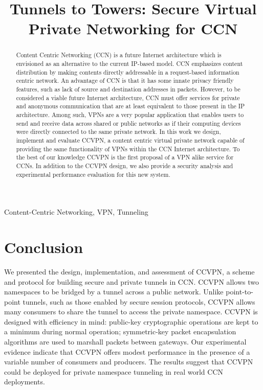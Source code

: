 \documentclass[conference,letterpaper,10pt]{IEEEtran}
\begin{document}
\title{Tunnels to Towers: Secure Virtual Private Networking for CCN}


\maketitle


\begin{abstract}
Content Centric Networking (CCN) is a future Internet architecture which is envisioned as an alternative to the current IP-based model. CCN emphasizes content distribution by making contents directly addressable in a request-based information centric network. An advantage of CCN is that it has some innate privacy friendly features, such as lack of source and destination addresses in packets. However, to be considered a viable future Internet architecture, CCN must offer services for private and anonymous communication that are at least equivalent to those present in the IP architecture. Among such, VPNs are a very popular application that enables users to send and receive data across shared or public networks as if their computing devices were directly connected to the same private network. In this work we design, implement and evaluate CCVPN, a content centric virtual private network capable of providing the same functionality of VPNs within the CCN Internet architecture. To the best of our knowledge CCVPN is the first proposal of a VPN alike service for CCNs. In addition to the CCVPN design, we also provide a security analysis and experimental performance evaluation for this new system.
\end{abstract}

\begin{IEEEkeywords}
Content-Centric Networking, VPN, Tunneling
\end{IEEEkeywords}

\IEEEpeerreviewmaketitle









\section{Conclusion}\label{sec:conclusion}
We presented the design, implementation, and assessment of CCVPN, a scheme and
protocol for building secure and private tunnels in CCN. CCVPN allows two namespaces
to be bridged by a tunnel across a public network. Unlike point-to-point tunnels,
such as those enabled by secure session protocols, CCVPN allows many consumers
to share the tunnel to access the private namespace. CCVPN is designed with efficiency
in mind: public-key cryptographic operations are kept to a minimum during normal
operation; symmetric-key packet encapsulation algorithms are used to marshall
packets between gateways. Our experimental evidence indicate that CCVPN offers
modest performance in the presence of a variable number of consumers and producers.
The results suggest that CCVPN could be deployed for private namespace tunneling
in real world CCN deployments.
\end{document}
